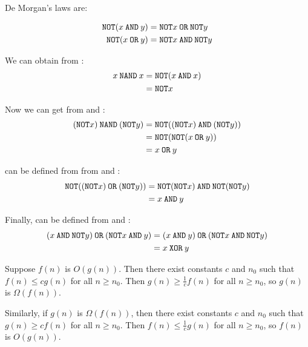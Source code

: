 \documentclass[12pt]{extarticle}
\begin{document}
De Morgan's laws are:

\begin{align*}
\mathbin{\texttt{NOT}} (x \mathbin{\texttt{AND}} y) & = \mathbin{\texttt{NOT}} x \mathbin{\texttt{OR}} \mathbin{\texttt{NOT}} y \\
\mathbin{\texttt{NOT}} (x \mathbin{\texttt{OR}} y) & = \mathbin{\texttt{NOT}} x \mathbin{\texttt{AND}} \mathbin{\texttt{NOT}} y
\end{align*}

We can obtain \boolnot from \boolnand:
\begin{align*}
x \mathbin{\texttt{NAND}} x & = \mathbin{\texttt{NOT}} (x \mathbin{\texttt{AND}} x) \\
& = \mathbin{\texttt{NOT}} x
\end{align*}

Now we can get \boolor from \boolnand and \boolnot:
\begin{align*}
(\mathbin{\texttt{NOT}} x) \mathbin{\texttt{NAND}} (\mathbin{\texttt{NOT}} y) & = \mathbin{\texttt{NOT}} ((\mathbin{\texttt{NOT}} x) \mathbin{\texttt{AND}} (\mathbin{\texttt{NOT}} y)) \\
& = \mathbin{\texttt{NOT}} (\mathbin{\texttt{NOT}} (x \mathbin{\texttt{OR}} y)) \\
& = x \mathbin{\texttt{OR}} y
\end{align*}

\booland can be defined from from \boolnot and \boolor:
\begin{align*}
\mathbin{\texttt{NOT}}((\mathbin{\texttt{NOT}} x) \mathbin{\texttt{OR}} (\mathbin{\texttt{NOT}} y)) & = \mathbin{\texttt{NOT}}(\mathbin{\texttt{NOT}} x) \mathbin{\texttt{AND}} \mathbin{\texttt{NOT}}(\mathbin{\texttt{NOT}} y) \\
 & = x \mathbin{\texttt{AND}} y
\end{align*}

Finally, \boolxor can be defined from \booland and \boolor:
\begin{align*}
(x \mathbin{\texttt{AND}} \mathbin{\texttt{NOT}} y) \mathbin{\texttt{OR}} (\mathbin{\texttt{NOT}} x \mathbin{\texttt{AND}} y) & = (x \mathbin{\texttt{AND}} y) \mathbin{\texttt{OR}} (\mathbin{\texttt{NOT}} x \mathbin{\texttt{AND}} \mathbin{\texttt{NOT}} y) \\
& = x \mathbin{\texttt{XOR}} y
\end{align*}



Suppose $f(n)$ is $O(g(n))$.
Then there exist constants $c$ and $n_0$ such that $f(n) \le c g(n)$ for all $n \ge n_0$.
Then $g(n) \ge \frac{1}{c} f(n)$ for all $n \ge n_0$, so $g(n)$ is $\Omega(f(n))$.

Similarly, if $g(n)$ is $\Omega(f(n))$, then there exist constants $c$ and $n_0$ such that $g(n) \ge c f(n)$ for all $n \ge n_0$.
Then $f(n) \le \frac{1}{c} g(n)$ for all $n \ge n_0$, so $f(n)$ is $O(g(n))$.
\end{document}
